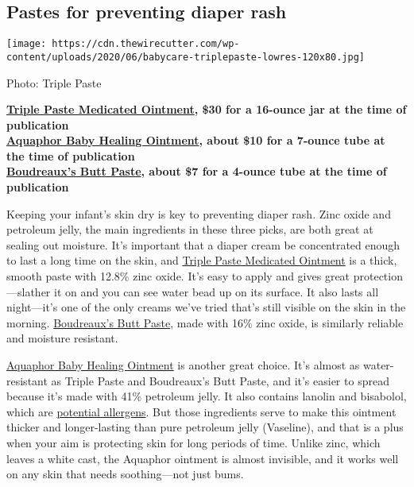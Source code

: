\hypertarget{pastes-for-preventing-diaper-rash}{%
\subsection{Pastes for preventing diaper
rash}\label{pastes-for-preventing-diaper-rash}}

\texttt{[image: https://cdn.thewirecutter.com/wp-content/uploads/2020/06/babycare-triplepaste-lowres-120x80.jpg]}

Photo: Triple Paste

\textbf{\href{https://www.nytimes3xbfgragh.onion/wirecutter/out/link/39067/162822/4/115954/?merchant=Amazon}{Triple
Paste Medicated Ointment}, \$30 for a 16-ounce jar at the time of
publication}\\
\textbf{\href{https://www.nytimes3xbfgragh.onion/wirecutter/out/link/39068/162823/4/115955/?merchant=Amazon}{Aquaphor
Baby Healing Ointment}, about \$10 for a 7-ounce tube at the time of
publication}\\
\textbf{\href{https://www.nytimes3xbfgragh.onion/wirecutter/out/link/39173/162990/4/116133/?merchant=Amazon}{Boudreaux's
Butt Paste}, about \$7 for a 4-ounce tube at the time of publication}

Keeping your infant's skin dry is key to preventing diaper rash. Zinc
oxide and petroleum jelly, the main ingredients in these three picks,
are both great at sealing out moisture. It's important that a diaper
cream be concentrated enough to last a long time on the skin, and
\href{https://www.nytimes3xbfgragh.onion/wirecutter/out/link/39067/162822/4/115954/?merchant=Amazon}{Triple
Paste Medicated Ointment} is a thick, smooth paste with 12.8\% zinc
oxide. It's easy to apply and gives great protection---slather it on and
you can see water bead up on its surface. It also lasts all night---it's
one of the only creams we've tried that's still visible on the skin in
the morning.
\href{https://www.nytimes3xbfgragh.onion/wirecutter/out/link/39173/162990/4/116133/?merchant=Amazon}{Boudreaux's
Butt Paste}, made with 16\% zinc oxide, is similarly reliable and
moisture resistant.

\href{https://www.nytimes3xbfgragh.onion/wirecutter/out/link/39068/162823/4/115955/?merchant=Amazon}{Aquaphor
Baby Healing Ointment} is another great choice. It's almost as
water-resistant as Triple Paste and Boudreaux's Butt Paste, and it's
easier to spread because it's made with 41\% petroleum jelly. It also
contains lanolin and bisabolol, which are
\href{https://www.ncbi.nlm.nih.gov/pubmed/27172304}{potential
allergens}. But those ingredients serve to make this ointment thicker
and longer-lasting than pure petroleum jelly (Vaseline), and that is a
plus when your aim is protecting skin for long periods of time. Unlike
zinc, which leaves a white cast, the Aquaphor ointment is almost
invisible, and it works well on any skin that needs soothing---not just
bums.

